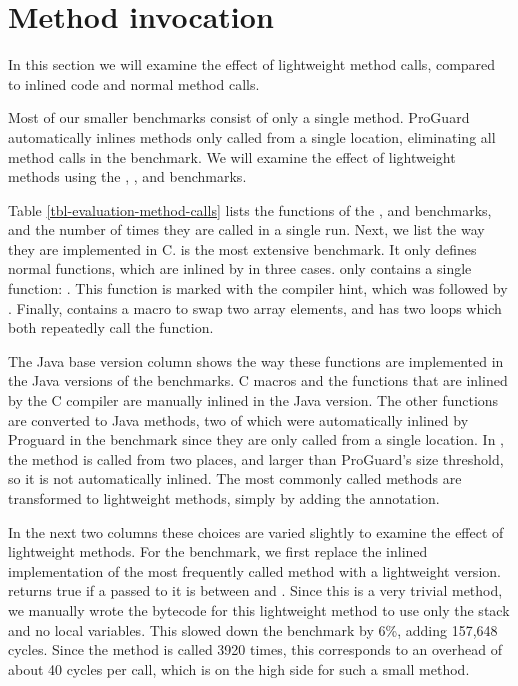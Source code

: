 \section{Method invocation}
\label{sec-evaluation-method-invocation}


In this section we will examine the effect of lightweight method calls, compared to inlined code and normal method calls.

Most of our smaller benchmarks consist of only a single method. ProGuard automatically inlines methods only called from a single location, eliminating all method calls in the  benchmark. We will examine the effect of lightweight methods using the , , and  benchmarks.

Table \ref{tbl-evaluation-method-calls} lists the functions of the ,  and  benchmarks, and the number of times they are called in a single run. Next, we list the way they are implemented in C.  is the most extensive benchmark. It only defines normal functions, which are inlined by  in three cases.  only contains a single function: . This function is marked with the  compiler hint, which was followed by . Finally,  contains a macro to swap two array elements, and has two loops which both repeatedly call the  function. 

The Java base version column shows the way these functions are implemented in the Java versions of the benchmarks. C macros and the functions that are inlined by the C compiler are manually inlined in the Java version. The other functions are converted to Java methods, two of which were automatically inlined by Proguard in the  benchmark since they are only called from a single location. In , the  method is called from two places, and larger than ProGuard's size threshold, so it is not automatically inlined. The most commonly called methods are transformed to lightweight methods, simply by adding the  annotation. %

In the next two columns these choices are varied slightly to examine the effect of lightweight methods. For the  benchmark, we first replace the inlined implementation of the most frequently called method with a lightweight version.  returns true if a  passed to it is between  and . Since this is a very trivial method, we manually wrote the bytecode for this lightweight method to use only the stack and no local variables. This slowed down the benchmark by 6\%, adding 157,648 cycles. Since the method is called 3920 times, this corresponds to an overhead of about 40 cycles per call, which is on the high side for such a small method.

